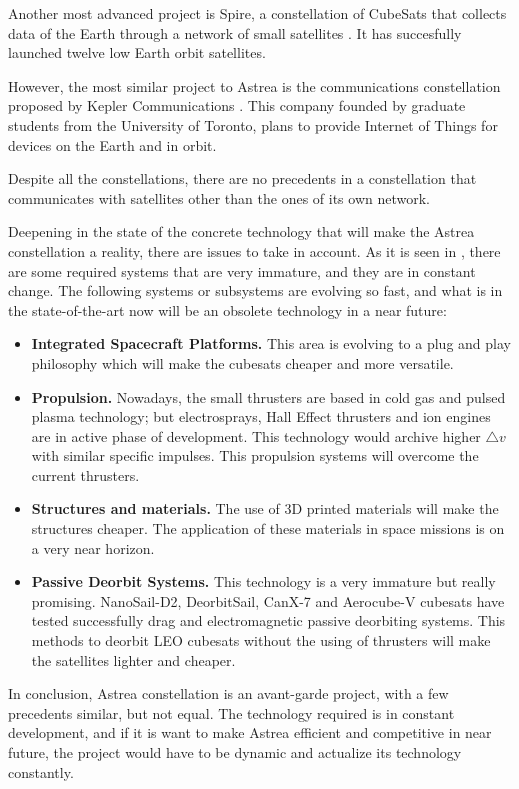 Another most advanced project is Spire, a constellation of CubeSats that collects data of the Earth through a network of small satellites \cite{spire}. It has succesfully launched twelve low Earth orbit satellites.

However, the most similar project to Astrea is the communications constellation proposed by Kepler Communications \cite{keppler}. This company founded by graduate students from the University of Toronto, plans to provide Internet of Things for devices on the Earth and in orbit.

Despite all the constellations, there are no precedents in a constellation that communicates with satellites other than the ones of its own network.

Deepening in the state of the concrete technology that will make the Astrea constellation a reality, there are issues to take in account. As it is seen in \cite{SOTA}, there are some required systems that are very immature, and they are in constant change. The following systems or subsystems are evolving so fast, and what is in the state-of-the-art now will be an obsolete technology in a near future:

\begin{itemize}
\item \textbf{Integrated Spacecraft Platforms.} This area is evolving to a plug and play philosophy which will make the cubesats cheaper and more versatile.
\item \textbf{Propulsion.} Nowadays, the small thrusters are based in cold gas and pulsed plasma technology; but electrosprays, Hall Effect thrusters and ion engines are in active phase of development. This technology would archive higher $\bigtriangleup v $ with similar specific impulses. This propulsion systems will overcome the current thrusters.
\item \textbf{Structures and materials.} The use of 3D printed materials will make the structures cheaper. The application of these materials in space missions is on a very near horizon.
\item \textbf{Passive Deorbit Systems.} This technology is a very immature but really promising. NanoSail-D2, DeorbitSail, CanX-7 and Aerocube-V cubesats have tested successfully drag and electromagnetic passive deorbiting systems. This methods to deorbit LEO cubesats without the using of thrusters will make the satellites lighter and cheaper.
\end{itemize}

In conclusion, Astrea constellation is an avant-garde project, with a few precedents similar, but not equal. The technology required is in constant development, and if it is want to make Astrea efficient and competitive in near future, the project would have to be dynamic and actualize its technology constantly. 